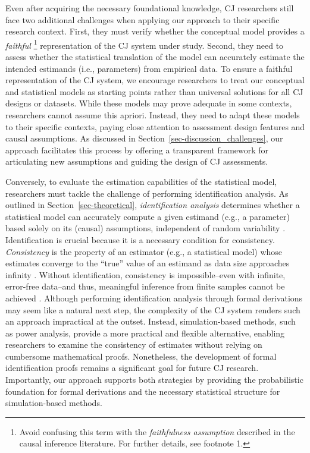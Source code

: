 \documentclass[
  authoryear,
  review,
  1p]{elsarticle}
\begin{document}
Even after acquiring the necessary foundational knowledge, CJ
researchers still face two additional challenges when applying our
approach to their specific research context. First, they must verify
whether the conceptual model provides a \emph{faithful} \footnote{Avoid
  confusing this term with the \emph{faithfulness assumption}
  \citep{Neal_2020, Hernan_et_al_2025} described in the causal inference
  literature. For further details, see footnote 1.} representation of
the CJ system under study. Second, they need to assess whether the
statistical translation of the model can accurately estimate the
intended estimands (i.e., parameters) from empirical data. To ensure a
faithful representation of the CJ system, we encourage researchers to
treat our conceptual and statistical models as starting points rather
than universal solutions for all CJ designs or datasets. While these
models may prove adequate in some contexts, researchers cannot assume
this apriori. Instead, they need to adapt these models to their specific
contexts, paying close attention to assessment design features and
causal assumptions. As discussed in
Section~\ref{sec-discussion_challenges}, our approach facilitates this
process by offering a transparent framework for articulating new
assumptions and guiding the design of CJ assessments.

Conversely, to evaluate the estimation capabilities of the statistical
model, researchers must tackle the challenge of performing
identification analysis. As outlined in Section~\ref{sec-theoretical},
\emph{identification analysis} determines whether a statistical model
can accurately compute a given estimand (e.g., a parameter) based solely
on its (causal) assumptions, independent of random variability
\citep{Schuessler_et_al_2023}. Identification is crucial because it is a
necessary condition for consistency. \emph{Consistency} is the property
of an estimator (e.g., a statistical model) whose estimates converge to
the ``true'' value of an estimand as data size approaches infinity
\citep{Everitt_et_al_2010}. Without identification, consistency is
impossible--even with infinite, error-free data--and thus, meaningful
inference from finite samples cannot be achieved
\citep{Schuessler_et_al_2023}. Although performing identification
analysis through formal derivations may seem like a natural next step,
the complexity of the CJ system renders such an approach impractical at
the outset. Instead, simulation-based methods, such as power analysis,
provide a more practical and flexible alternative, enabling researchers
to examine the consistency of estimates without relying on cumbersome
mathematical proofs. Nonetheless, the development of formal
identification proofs remains a significant goal for future CJ research.
Importantly, our approach supports both strategies by providing the
probabilistic foundation for formal derivations and the necessary
statistical structure for simulation-based methods.
\end{document}

